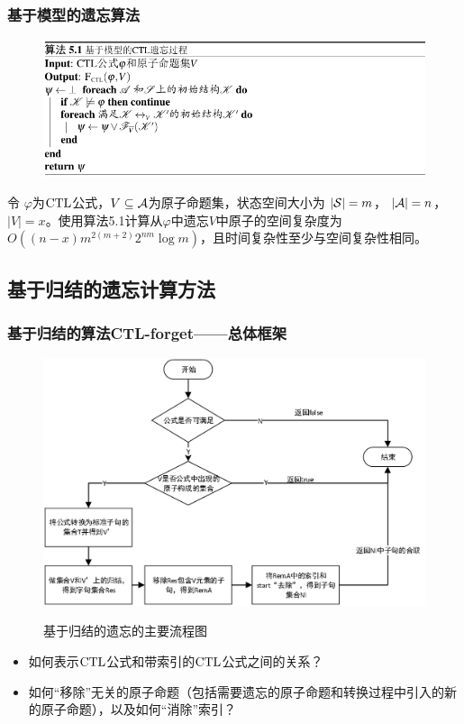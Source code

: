 \documentclass[9pt, CJK]{beamer}
\begin{document}
\begin{frame}
	\frametitle{基于模型的遗忘算法}
	{\footnotesize 
		\begin{figure}
			\includegraphics[scale=0.45]{figures/model-basedAlg}
		\end{figure}
	
	\begin{proposition}\label{pro:time:alg1}
		令 $\varphi$为$\textrm{CTL}$公式，$V\subseteq {\cal A}$为原子命题集，状态空间大小为 $|{\cal S}|=m$， $|{\cal A}|=n$，$|V|=x$。使用算法5.1计算从$\varphi$中遗忘$V$中原子的空间复杂度为 $O((n-x)m^{2(m+2)}2^{nm}  \log m)$，且时间复杂性至少与空间复杂性相同。
	\end{proposition}
	}
\end{frame}

\subsection{基于归结的遗忘计算方法}
\begin{frame}
	\frametitle{基于归结的算法CTL-forget——{\footnotesize 总体框架}}
	{\footnotesize
		\begin{figure}
			\centering
			\includegraphics[scale=0.5]{figures/frame2}\\
			\caption{基于归结的遗忘的主要流程图}
			\label{Fig:chapter05:v1uv2}
		\end{figure}
	\pause
	\begin{itemize}
		\item 如何表示$\textrm{CTL}$公式和带索引的$\textrm{CTL}$公式之间的关系？
		\item 如何“移除”无关的原子命题（包括需要遗忘的原子命题和转换过程中引入的新的原子命题），以及如何“消除”索引？
	\end{itemize}
	}
\end{frame}
\end{document}
